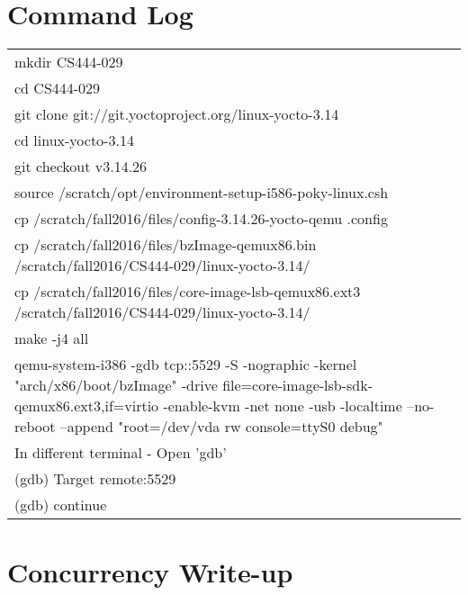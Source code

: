 \documentclass[letterpaper,10pt,draftclsnofoot,titlepage,onecolumn]{IEEEtran}
\begin{document}
	\section{Command Log}
		\setcounter{rowcount}{0}
		\begin{tabular}{@{\stepcounter{rowcount}\therowcount.)\hspace*{\tabcolsep}}ll}	
			mkdir CS444-029 \\
			
			cd CS444-029 \\
			
			git clone git://git.yoctoproject.org/linux-yocto-3.14 \\
			
			cd linux-yocto-3.14	\\		
			
			git checkout v3.14.26 \\	
			
			source /scratch/opt/environment-setup-i586-poky-linux.csh \\	
					
			cp /scratch/fall2016/files/config-3.14.26-yocto-qemu .config \\
			
			cp /scratch/fall2016/files/bzImage-qemux86.bin /scratch/fall2016/CS444-029/linux-yocto-3.14/ \\
			
			cp /scratch/fall2016/files/core-image-lsb-qemux86.ext3 /scratch/fall2016/CS444-029/linux-yocto-3.14/ \\
			
			make -j4 all \\
			
			qemu-system-i386 -gdb tcp::5529 -S -nographic -kernel "arch/x86/boot/bzImage" \newline -drive file=core-image-lsb-sdk-qemux86.ext3,if=virtio -enable-kvm -net none -usb -localtime --no-reboot --append "root=/dev/vda rw console=ttyS0 debug" \\
			
			In different terminal - Open 'gdb' \\
			
			(gdb) Target remote:5529 \\
			
			(gdb) continue \\
			
		\end{tabular}

	\clearpage
	\section{Concurrency Write-up}
	
\end{document}
